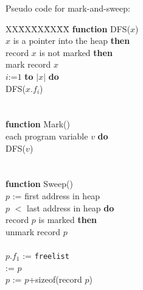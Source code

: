 \begin{slide*}
Pseudo code for mark-and-sweep:\\

\begin{scriptsize}
\begin{tabbing}
XX\=XX\=XX\=XX\=XX\=\kill
{\bf function} DFS($x$)\\
 $x$ is a pointer into the heap {\bf then}\\
\> record $x$ is not marked {\bf then}\\
\>\>\>mark record $x$\\
\>\> $i$:=$1$ {\bf to} $|x|$ {\bf do}\\
\>\>\>\>DFS($x.f_i$)\\
\\
\\
{\bf function} Mark()\\
 each program variable $v$ {\bf do}\\
\>\>DFS($v$)\\
\\
\\
{\bf function} Sweep()\\
\>$p$ := first address in heap\\
 $p$ $<$ last address in heap {\bf do}\\
\> record $p$ is marked {\bf then}\\
\>\>\>unmark record $p$\\
\>\\
\>\>\>$p.f_1$ := {\tt freelist}\\
\>\> := $p$\\
\>\>$p$ := $p$+sizeof(record $p$)
\end{tabbing}
\end{scriptsize}
\vfil
\end{slide*}
 
